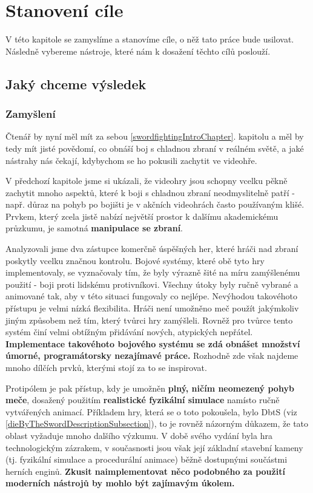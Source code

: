 \chapter{Stanovení cíle} \label{goalSettingChapter}

V této kapitole se zamyslíme a stanovíme cíle, o něž tato práce bude usilovat. Následně vybereme nástroje, které nám k dosažení těchto cílů poslouží.  


\section{Jaký chceme výsledek}

\subsection{Zamyšlení}
Čtenář by nyní měl mít za sebou \ref{swordfightingIntroChapter}. kapitolu a měl by tedy mít jisté povědomí, co obnáší boj s chladnou zbraní v reálném světě, a jaké nástrahy nás čekají, kdybychom se ho pokusili zachytit ve videohře. 

V předchozí kapitole jsme si ukázali, že videohry jsou schopny vcelku pěkně zachytit mnoho aspektů, které k boji s chladnou zbraní neodmyslitelně patří - např. důraz na pohyb po bojišti je v akčních videohrách často používaným klišé. Prvkem, který zcela jistě nabízí největší prostor k dalšímu akademickému průzkumu, je samotná \textbf{manipulace se zbraní}.

Analyzovali jsme dva zástupce komerčně úspěšných her, které hráči nad zbraní poskytly vcelku značnou kontrolu. Bojové systémy, které obě tyto hry implementovaly, se vyznačovaly tím, že byly výrazně šité na míru zamýšlenému použití - boji proti lidskému protivníkovi. Všechny útoky byly ručně vybrané a animované tak, aby v této situaci fungovaly co nejlépe. Nevýhodou takovéhoto přístupu je velmi nízká flexibilita. Hráči není umožněno meč použít jakýmkoliv jiným způsobem než tím, který tvůrci hry zamýšleli. Rovněž pro tvůrce tento systém činí velmi obtížným přidávání nových, atypických nepřátel. \textbf{Implementace takovéhoto bojového systému se zdá obnášet množství úmorné, programátorsky nezajímavé práce.} Rozhodně zde však najdeme mnoho dílčích prvků, kterými stojí za to se inspirovat.

Protipólem je pak přístup, kdy je umožněn \textbf{plný, ničím neomezený pohyb meče}, dosažený použitím \textbf{realistické fyzikální simulace} namísto ručně vytvářených animací. Příkladem hry, která se o toto pokoušela, bylo \acl{DbtS} (viz \ref{dieByTheSwordDescriptionSubsection}), to je rovněž názorným důkazem, že tato oblast vyžaduje mnoho dalšího výzkumu. V době svého vydání byla hra technologickým zázrakem, v současnosti jsou však její základní stavební kameny (tj. fyzikální simulace a procedurální animace) běžně dostupnými součástmi herních enginů. \textbf{Zkusit naimplementovat něco podobného za použití moderních nástrojů by mohlo být zajímavým úkolem.}


